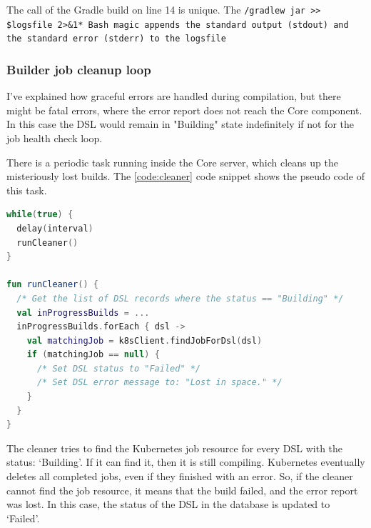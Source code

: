 The call of the Gradle build on line 14 is unique. The \lstinline*./gradlew jar >> $logsfile 2>&1* Bash magic appends the standard output (stdout) and the standard error (stderr) to the logsfile.

\subsubsection{Builder job cleanup loop}

I've explained how graceful errors are handled during compilation, but there might be fatal errors, where the error report does not reach the Core component. In this case the DSL would remain in "Building" state indefinitely if not for the job health check loop.

There is a periodic task running inside the Core server, which cleans up the misteriously lost builds. The \ref{code:cleaner} code snippet shows the pseudo code of this task.

\begin{lstlisting}[caption={Job cleaner loop},language=Kotlin,label=code:cleaner]
while(true) {
  delay(interval)
  runCleaner()
}

fun runCleaner() {
  /* Get the list of DSL records where the status == "Building" */
  val inProgressBuilds = ...
  inProgressBuilds.forEach { dsl ->
    val matchingJob = k8sClient.findJobForDsl(dsl)
    if (matchingJob == null) {
      /* Set DSL status to "Failed" */
      /* Set DSL error message to: "Lost in space." */
    }
  }
}
\end{lstlisting}

The cleaner tries to find the Kubernetes job resource for every DSL with the status: `Building'. If it can find it, then it is still compiling. Kubernetes eventually deletes all completed jobs, even if they finished with an error. So, if the cleaner cannot find the job resource, it means that the build failed, and the error report was lost. In this case, the status of the DSL in the database is updated to `Failed'.